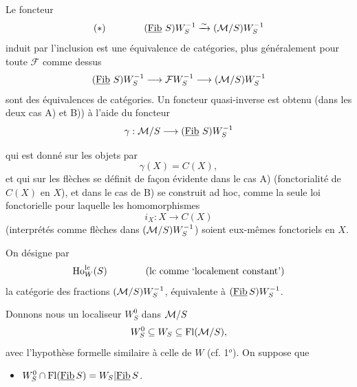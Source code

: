  Le foncteur
\[
(\ast)\qquad\qquad(\underline{\mathrm{Fib}}\,\,S)W_S^{-1}\xrightarrow{\sim}(\mathcal{M}/S)W_S^{-1}
\]
induit par l'inclusion est une équivalence de catégories, plus généralement pour toute $\mathcal{F}$ comme dessus
\[
(\underline{\mathrm{Fib}}\,\,S)W_S^{-1}\longrightarrow\mathcal{F}W_S^{-1}\longrightarrow(\mathcal{M}/S)W_S^{-1}
\]
sont des équivalences de catégories. Un foncteur quasi-inverse est obtenu (dans les deux cas A) et B)) à l'aide du foncteur
\[
\gamma : \mathcal{M}/S\longrightarrow(\underline{\mathrm{Fib}}\,\,S)W_S^{-1}
\]


\setcounter{footnote}{59}

qui est donné sur les objets par
\[\gamma(X) = C(X),\]
et qui sur les flèches se définit de façon évidente dans le cas A) (fonctorialité de $C(X)$ en $X$), et dans le cas de B) se construit ad hoc, comme la seule loi fonctorielle pour laquelle les homomorphismes
\[i_X : X \longrightarrow C(X)\]
(interprétés comme flèches dans $(\mathcal{M}/S)W_S^{-1}$) soient eux-mêmes fonctoriels en $X$.

On désigne par
\[\mathrm{Ho}^{\mathrm{lc}}_W(S) \qquad\qquad \text{(lc comme ‘localement constant’)}\]
la catégorie des fractions $(\mathcal{M}/S)W_S^{-1}$, équivalente à $(\underline{\mathrm{Fib}}\, S)W_S^{-1}$.

 Donnons nous un localiseur $W_S^0$ dans $\mathcal{M}/S$
\[W_S^0 \subseteq W_S \subseteq \mathrm{Fl}(\mathcal{M}/S),\]
avec l'hypothèse formelle similaire à celle de $W$ (cf. 1$^o$). On suppose que

\begin{itemize}[leftmargin=4em]
\item[3$^o$)] $W_S^0 \cap \mathrm{Fl}(\underline{\mathrm{Fib}}\, S) = W_S|\underline{\mathrm{Fib}}\, S$.
\end{itemize}

